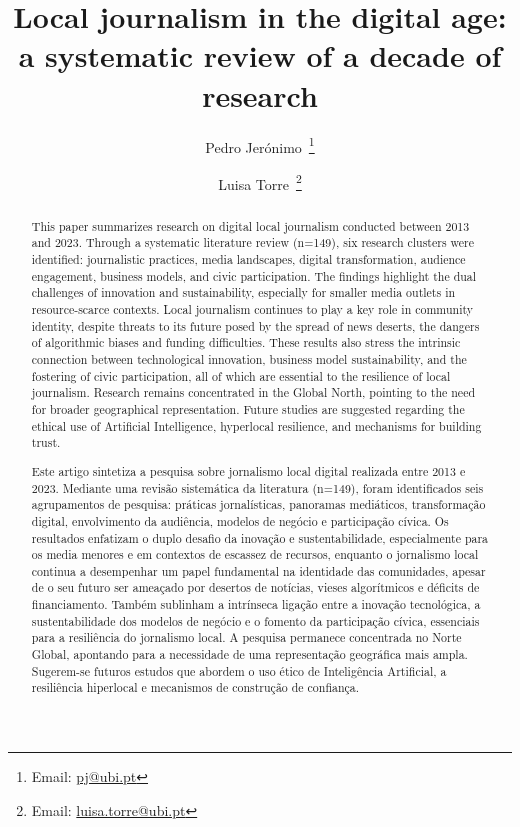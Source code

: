 \documentclass[english]{textolivre}
\title{Local journalism in the digital age: a systematic review of a decade of research}
\author[1]{Pedro Jerónimo~\orcid{0000-0003-1900-5031}\thanks{Email: \href{mailto:pj@ubi.pt}{pj@ubi.pt}}}
\author[1]{Luisa Torre~\orcid{0000-0002-5948-106X}\thanks{Email: \href{mailto:luisa.torre@ubi.pt}{luisa.torre@ubi.pt}}}
\affil[1]{University of Beira Interior, Faculty of Arts and Letters, Department of Communication, Philosophy and Politics, LabCom - Communication Laboratory, Covilhã, Portugal.}
\begin{document}
\maketitle

\begin{polyabstract}
\begin{abstract}
This paper summarizes research on digital local journalism conducted between 2013 and 2023. Through a systematic literature review (n=149), six research clusters were identified: journalistic practices, media landscapes, digital transformation, audience engagement, business models, and civic participation. The findings highlight the dual challenges of innovation and sustainability, especially for smaller media outlets in resource-scarce contexts. Local journalism continues to play a key role in community identity, despite threats to its future posed by the spread of news deserts, the dangers of algorithmic biases and funding difficulties. These results also stress the intrinsic connection between technological innovation, business model sustainability, and the fostering of civic participation, all of which are essential to the resilience of local journalism. Research remains concentrated in the Global North, pointing to the need for broader geographical representation. Future studies are suggested regarding the ethical use of Artificial Intelligence, hyperlocal resilience, and mechanisms for building trust.

\end{abstract}

\begin{portuguese}
\begin{abstract}
Este artigo sintetiza a pesquisa sobre jornalismo local digital realizada entre 2013 e 2023. Mediante uma revisão sistemática da literatura (n=149), foram identificados seis agrupamentos de pesquisa: práticas jornalísticas, panoramas mediáticos, transformação digital, envolvimento da audiência, modelos de negócio e participação cívica. Os resultados enfatizam o duplo desafio da inovação e sustentabilidade, especialmente para os media menores e em contextos de escassez de recursos, enquanto o jornalismo local continua a desempenhar um papel fundamental na identidade das comunidades, apesar de o seu futuro ser ameaçado por desertos de notícias, vieses algorítmicos e déficits de financiamento. Também sublinham a intrínseca ligação entre a inovação tecnológica, a sustentabilidade dos modelos de negócio e o fomento da participação cívica, essenciais para a resiliência do jornalismo local. A pesquisa permanece concentrada no Norte Global, apontando para a necessidade de uma representação geográfica mais ampla. Sugerem-se futuros estudos que abordem o uso ético de Inteligência Artificial, a resiliência hiperlocal e mecanismos de construção de confiança.


\end{abstract}
\end{portuguese}
\end{polyabstract}
\end{document}
